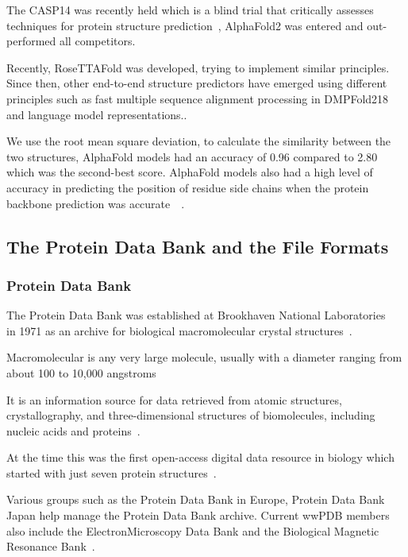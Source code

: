 \documentclass[]{final_report}
\begin{document}
The CASP14 was recently held which is a blind trial that critically assesses
techniques for protein structure prediction~\cite{david_alphafold_2022}, AlphaFold2 was entered and out-performed all competitors. 

Recently, RoseTTAFold was developed, trying to implement similar principles. Since then, other end-to-end structure predictors have emerged using different principles such as fast multiple sequence alignment processing in DMPFold218 and language model representations.\cite{bryant_improved_2022}.

We use the root mean square deviation, to calculate the similarity between the two structures, AlphaFold models had an accuracy of 0.96 compared to 2.80 which was the second-best score. AlphaFold models also had a high level of accuracy in predicting the position of residue side chains when the protein backbone prediction was accurate~\cite{david_alphafold_2022}~\cite{jumper_highly_2021}.

\clearpage

\subsection{The Protein Data Bank and the File Formats}

\subsubsection{Protein Data Bank}

The Protein Data Bank was established at Brookhaven National Laboratories ~\cite{bernstein_protein_1977} in 1971 as an archive for biological macromolecular crystal structures~\cite{berman_protein_2000}.

\begin{definition}[Macromolecular]
    Macromolecular is any very large molecule, usually with a diameter ranging from about 100 to 10,000 angstroms
\end{definition}

It is an information source for data retrieved from atomic structures, crystallography, and three-dimensional structures of biomolecules, including nucleic acids and proteins~\cite{behzadi_worldwide_2021}. 

At the time this was the first open-access digital data resource in biology which started with just seven protein structures~\cite{burley_rcsb_2022}.

Various groups such as the Protein Data Bank in Europe, Protein Data Bank Japan help manage the Protein Data Bank archive. Current wwPDB members also include the ElectronMicroscopy Data Bank and the Biological Magnetic Resonance Bank~\cite{burley_rcsb_2022}.
\end{document}
